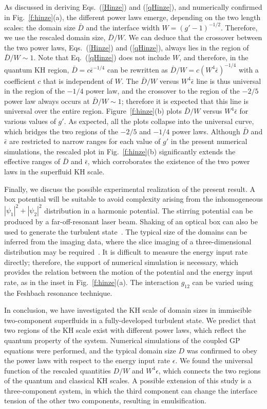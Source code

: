 \documentclass[pra,aps,superscriptaddress,twocolumn]{revtex4-2}
\begin{document}
As discussed in deriving Eqs.~(\ref{Hinze}) and (\ref{qHinze}), and
numerically confirmed in Fig.~\ref{f:hinze}(a), the different power laws
emerge, depending on the two length scales: the domain size $\bar D$ and the
interface width $W = (g' - 1)^{-1/2}$.
Therefore, we use the rescaled domain size, $\bar D / W$.
We can deduce that the crossover between the two power laws,
Eqs.~(\ref{Hinze}) and (\ref{qHinze}), always lies in the region of
$\bar D / W \sim 1$. 
Note that Eq.~(\ref{qHinze}) does not include $W$, and therefore, in the
quantum KH region, $\bar D = c \bar\epsilon^{-1/4}$ can be rewritten as
$\bar D / W = c (W^4 \bar\epsilon)^{-1/4}$ with a coefficient $c$ that is
independent of $W$.
The $\bar D / W$ versus $W^4 \bar\epsilon$ line is thus universal in the
region of the $-1/4$ power law, and the crossover to the region of the
$-2/5$ power law always occurs at $\bar D / W \sim 1$; therefore it is
expected that this line is universal over the entire region.
Figure~\ref{f:hinze}(b) plots $\bar D / W$ versus $W^4 \bar\epsilon$ for
various values of $g'$.
As expected, all the plots collapse into the universal curve, which bridges
the two regions of the $-2/5$ and $-1/4$ power laws.
Although $\bar D$ and $\bar\epsilon$ are restricted to narrow ranges for
each value of $g'$ in the present numerical simulations, the rescaled plot
in Fig.~\ref{f:hinze}(b) significantly extends the effective ranges of $\bar
D$ and $\bar\epsilon$, which corroborates the existence of the two power
laws in the superfluid KH scale.

Finally, we discuss the possible experimental realization of the present
result.
A box potential will be suitable to avoid complexity arising from the
inhomogeneous $|\psi_1|^2 + |\psi_2|^2$ distribution in a harmonic
potential.
The stirring potential can be produced by a far-off-resonant laser beam.
Shaking of an optical box can also be used to generate the turbulent
state~\cite{Navon}.
The typical size of the domains can be inferred from the imaging data, where
the slice imaging of a three-dimensional distribution may be
required~\cite{Andrews}.
It is difficult to measure the energy input rate directly; therefore, the
support of numerical simulation is necessary, which provides the relation
between the motion of the potential and the energy input rate, as in the
inset in Fig.~\ref{f:hinze}(a).
The interaction $g_{12}$ can be varied using the Feshbach resonance
technique.

In conclusion, we have investigated the KH scale of domain sizes in
immiscible two-component superfluids in a fully-developed turbulent state.
We predict that two regions of the KH scale exist with different power
laws, which reflect the quantum property of the system.
Numerical simulations of the coupled GP equations were performed, and the
typical domain size $D$ was confirmed to obey the power laws with respect to
the energy input rate $\epsilon$.
We found the universal function of the rescaled quantities $D / W$ and
$W^4 \epsilon$, which connects the two regions of the quantum and
classical KH scales.
A possible extension of this study is a three-component system, in which the
third component can change the interface tension of the other two
components, resulting in emulsification.
\end{document}
